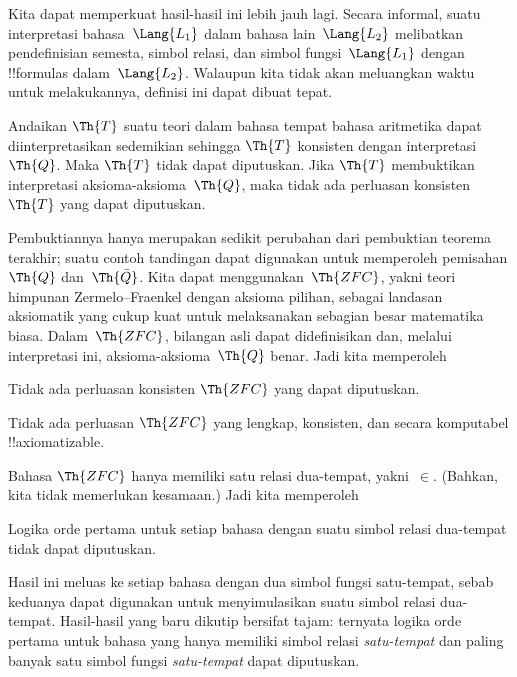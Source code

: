 \documentclass[../../../include/open-logic-section]{subfiles}
\begin{document}


Kita dapat memperkuat hasil-hasil ini lebih jauh lagi. Secara informal, suatu
interpretasi bahasa~$\Lang{L_1}$ dalam bahasa lain~$\Lang{L_2}$ melibatkan
pendefinisian semesta, simbol relasi, dan simbol fungsi~$\Lang{L_1}$ dengan
!!{formula}s dalam~$\Lang{L_2}$. Walaupun kita tidak akan meluangkan waktu
untuk melakukannya, definisi ini dapat dibuat tepat.

\begin{thm}
  Andaikan $\Th{T}$ suatu teori dalam bahasa tempat bahasa aritmetika dapat
  diinterpretasikan sedemikian sehingga $\Th{T}$ konsisten dengan
  interpretasi~$\Th{Q}$. Maka $\Th{T}$ tidak dapat diputuskan. Jika $\Th{T}$
  membuktikan interpretasi aksioma-aksioma~$\Th{Q}$, maka tidak ada perluasan
  konsisten~$\Th{T}$ yang dapat diputuskan.
\end{thm}

Pembuktiannya hanya merupakan sedikit perubahan dari pembuktian teorema
terakhir; suatu contoh tandingan dapat digunakan untuk memperoleh pemisahan
$\Th{Q}$ dan~$\Th{\bar Q}$. Kita dapat menggunakan~$\Th{ZFC}$, yakni teori
himpunan Zermelo--Fraenkel dengan aksioma pilihan, sebagai landasan aksiomatik
yang cukup kuat untuk melaksanakan sebagian besar matematika biasa.
Dalam~$\Th{ZFC}$, bilangan asli dapat didefinisikan dan, melalui interpretasi
ini, aksioma-aksioma~$\Th{Q}$ benar. Jadi kita memperoleh

\begin{cor}
Tidak ada perluasan konsisten $\Th{ZFC}$ yang dapat diputuskan.
\end{cor}

\begin{cor}
Tidak ada perluasan $\Th{ZFC}$ yang lengkap, konsisten, dan secara komputabel
!!{axiomatizable}.
\end{cor}

Bahasa $\Th{ZFC}$ hanya memiliki satu relasi dua-tempat, yakni~$\in$. (Bahkan,
kita tidak memerlukan kesamaan.) Jadi kita memperoleh

\begin{cor}
Logika orde pertama untuk setiap bahasa dengan suatu simbol relasi dua-tempat
tidak dapat diputuskan.
\end{cor}

Hasil ini meluas ke setiap bahasa dengan dua simbol fungsi satu-tempat, sebab
keduanya dapat digunakan untuk menyimulasikan suatu simbol relasi dua-tempat.
Hasil-hasil yang baru dikutip bersifat tajam: ternyata logika orde pertama
untuk bahasa yang hanya memiliki simbol relasi \emph{satu-tempat} dan paling
banyak satu simbol fungsi \emph{satu-tempat} dapat diputuskan.
\end{document}
